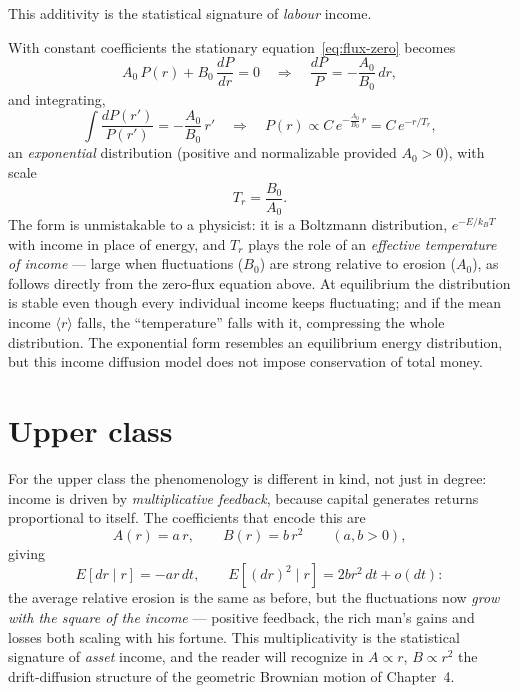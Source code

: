 This additivity is the statistical signature of \emph{labour} income.

With constant coefficients the stationary equation~\eqref{eq:flux-zero} becomes
\begin{equation}
A_0\, P(r) + B_0\,\frac{dP}{dr} = 0 \quad\Longrightarrow\quad \frac{dP}{P} = -\frac{A_0}{B_0}\, dr,
\end{equation}
and integrating,
\begin{equation}
\int\!\frac{dP(r')}{P(r')} = -\frac{A_0}{B_0}\,r' \quad\Longrightarrow\quad P(r) \propto C\, e^{-\frac{A_0}{B_0}\, r} = C\, e^{-r/T_r},
\end{equation}
an \emph{exponential} distribution (positive and normalizable provided $A_0 > 0$), with scale
\begin{equation}\label{eq:boltzmann-income}
T_r = \frac{B_0}{A_0}.
\end{equation}
The form is unmistakable to a physicist: it is a Boltzmann distribution, $e^{-E/k_BT}$ with income in place of energy, and $T_r$ plays the role of an \emph{effective temperature of income} --- large when fluctuations ($B_0$) are strong relative to erosion ($A_0$), as follows directly from the zero-flux equation above.
At equilibrium the distribution is stable even though every individual income keeps fluctuating; and if the mean income $\langle r\rangle$ falls, the ``temperature'' falls with it, compressing the whole distribution.
The exponential form resembles an equilibrium energy distribution, but this income diffusion model does not impose conservation of total money.


\section{Upper class}\label{sec:upper-class}

For the upper class the phenomenology is different in kind, not just in degree: income is driven by \emph{multiplicative feedback}, because capital generates returns proportional to itself.
The coefficients that encode this are
\begin{equation}
A(r) = a\,r, \qquad B(r) = b\,r^2 \qquad (a, b > 0),
\end{equation}
giving
\begin{equation}
E[dr\mid r]=-ar\,dt,\qquad E[(dr)^2\mid r]=2br^2\,dt+o(dt):
\end{equation}
the average relative erosion is the same as before, but the fluctuations now \emph{grow with the square of the income} --- positive feedback, the rich man's gains and losses both scaling with his fortune.
This multiplicativity is the statistical signature of \emph{asset} income, and the reader will recognize in $A\propto r$, $B\propto r^2$ the drift-diffusion structure of the geometric Brownian motion of Chapter~4.

